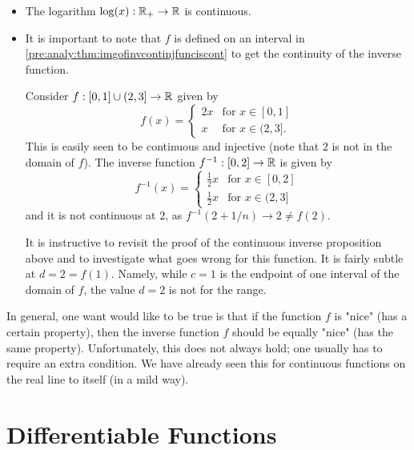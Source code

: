 \documentclass[10pt, a4paper]{article}
\begin{document}
\begin{example}\phantom{}
    \begin{itemize}
        \item The logarithm $\log(x) : \mathbb{R}_{+} \rightarrow \mathbb{R}$ is continuous.
        \item It is important to note that $f$ is defined on an interval in \autoref{pre:analy:thm:imgofinvcontinjfunciscont} to get the continuity of the inverse function.

        Consider $f : [0, 1] \cup (2, 3] \rightarrow \mathbb{R}$ given by
        \[
        f(x) = \begin{cases}
            2x & \text{for } x \in [0, 1] \\
            x & \text{for } x \in (2, 3].
        \end{cases}
        \]
        This is easily seen to be continuous and injective
        (note that $2$ is not in the domain of $f$).
        The inverse function $f ^ {-1} : [0, 2] \rightarrow \mathbb{R}$ is given by
        \[
        f ^ {-1}(x) = \begin{cases}
            \frac{1}{2}x & \text{for } x \in [0, 2] \\
            \frac{1}{2}x & \text{for } x \in (2, 3]
        \end{cases}
        \]
        and it is not continuous at $2$,
        as $f ^ {-1}(2 + 1 / n) \rightarrow 2 \neq f(2)$.

        It is instructive to revisit the proof of the continuous inverse proposition above and to investigate what goes wrong for this function.
        It is fairly subtle at $d = 2 = f(1)$.
        Namely,
        while $c = 1$ is the endpoint of one interval of the domain of $f$,
        the value $d = 2$ is not for the range.
    \end{itemize}
\end{example}

\begin{remark}
    In general,
    one want would like to be true is that if the function $f$ is "nice"
    (has a certain property),
    then the inverse function $f$ should be equally "nice"
    (has the same property).
    Unfortunately,
    this does not always hold;
    one usually has to require an extra condition.
    We have already seen this for continuous functions on the real line to itself
    (in a mild way).
\end{remark}

\newpage

\section{Differentiable Functions}
\end{document}
